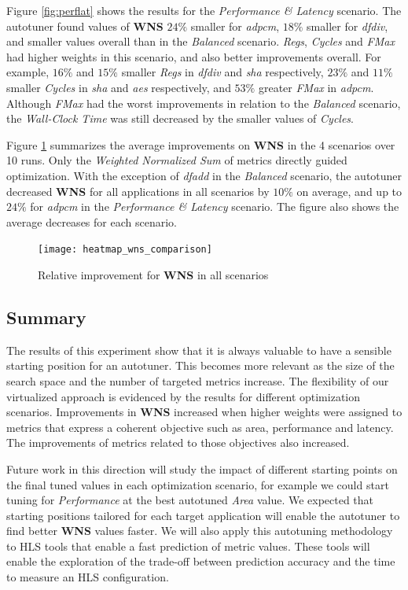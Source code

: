 Figure \ref{fig:perflat} shows the results for the \textit{Performance \&
Latency} scenario.  The autotuner found values of \textbf{WNS} $24\%$ smaller
for \textit{adpcm}, $18\%$ smaller for \textit{dfdiv}, and smaller values
overall than in the \textit{Balanced} scenario. \textit{Regs}, \textit{Cycles}
and \textit{FMax} had higher weights in this scenario, and also better
improvements overall.  For example, $16\%$ and $15\%$ smaller \textit{Regs} in
\textit{dfdiv} and \textit{sha} respectively, $23\%$ and $11\%$ smaller
\textit{Cycles} in \textit{sha} and \textit{aes} respectively, and $53\%$
greater \textit{FMax} in \textit{adpcm}. Although \textit{FMax} had the worst
improvements in relation to the \textit{Balanced} scenario, the
\textit{Wall-Clock Time} was still decreased by the smaller values of
\textit{Cycles}.

Figure \ref{fig:wns-comp} summarizes the average improvements on \textbf{WNS}
in the 4 scenarios over 10 runs. Only the \textit{Weighted Normalized Sum} of
metrics directly guided optimization. With the exception of \textit{dfadd} in
the \textit{Balanced} scenario, the autotuner decreased \textbf{WNS} for all
applications in all scenarios by $10\%$ on average, and up to $24\%$ for
\textit{adpcm} in the \textit{Performance \& Latency} scenario. The figure also
shows the average decreases for each scenario.

\begin{figure}[htpb]
    \centering
    \texttt{[image: heatmap\_wns\_comparison]}
    \caption{Relative improvement for \textbf{WNS} in all scenarios}
    \label{fig:wns-comp}
\end{figure}

\subsection{Summary}
\label{sec:FPGAconcl}

The results of this experiment show that it is always valuable to have a
sensible starting position for an autotuner. This becomes more relevant as the
size of the search space and the number of targeted metrics increase.  The
flexibility of our virtualized approach is evidenced by the results for
different optimization scenarios.  Improvements in \textbf{WNS} increased when
higher weights were assigned to metrics that express a coherent objective such
as area, performance and latency.  The improvements of metrics related to those
objectives also increased.

Future work in this direction will study the impact of different starting points on the
final tuned values in each optimization scenario, for example we could start
tuning for \textit{Performance} at the best autotuned \textit{Area} value.  We
expected that starting positions tailored for each target application will
enable the autotuner to find better \textbf{WNS} values faster.  We will also
apply this autotuning methodology to HLS tools that enable a fast prediction of
metric values. These tools will enable the exploration of the trade-off between
prediction accuracy and the time to measure an HLS configuration.
